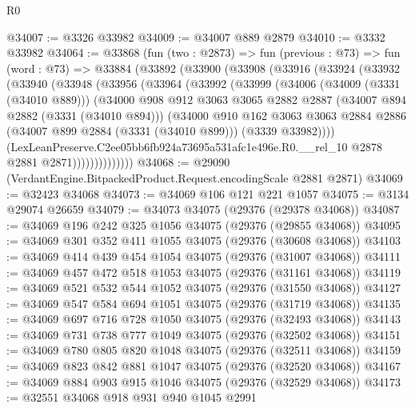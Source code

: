 \begin{lexlean}{R0}
\begin{coremodule}
@34007 := @3326 @33982
@34009 := @34007 @889 @2879
@34010 := @3332 @33982
@34064 := @33868
    (fun (two : @2873) =>
    fun (previous : @73) =>
    fun (word : @73) =>
    @33884
      (@33892
        (@33900
          (@33908
            (@33916
              (@33924
                (@33932
                  (@33940
                    (@33948
                      (@33956
                        (@33964
                          (@33992
                            (@33999
                              (@34006
                                (@34009 (@3331 (@34010 @889)))
                                (@34000
                                  @908
                                  @912
                                  @3063
                                  @3065
                                  @2882
                                  @2887
                                  (@34007 @894 @2882 (@3331 (@34010 @894)))
                                  (@34000
                                    @910
                                    @162
                                    @3063
                                    @3063
                                    @2884
                                    @2886
                                    (@34007 @899 @2884 (@3331 (@34010 @899)))
                                    (@3339 @33982))))
                              (LexLeanPreserve.C2ee05bb6fb924a73695a531afc1e496e.R0.__rel_10
                                @2878
                                @2881
                                @2871))))))))))))))
@34068 := @29090 (VerdantEngine.BitpackedProduct.Request.encodingScale @2881 @2871)
@34069 := @32423 @34068
@34073 := @34069 @106 @121 @221 @1057
@34075 := @3134 @29074 @26659
@34079 := @34073 @34075 (@29376 (@29378 @34068))
@34087 := @34069 @196 @242 @325 @1056 @34075 (@29376 (@29855 @34068))
@34095 := @34069 @301 @352 @411 @1055 @34075 (@29376 (@30608 @34068))
@34103 := @34069 @414 @439 @454 @1054 @34075 (@29376 (@31007 @34068))
@34111 := @34069 @457 @472 @518 @1053 @34075 (@29376 (@31161 @34068))
@34119 := @34069 @521 @532 @544 @1052 @34075 (@29376 (@31550 @34068))
@34127 := @34069 @547 @584 @694 @1051 @34075 (@29376 (@31719 @34068))
@34135 := @34069 @697 @716 @728 @1050 @34075 (@29376 (@32493 @34068))
@34143 := @34069 @731 @738 @777 @1049 @34075 (@29376 (@32502 @34068))
@34151 := @34069 @780 @805 @820 @1048 @34075 (@29376 (@32511 @34068))
@34159 := @34069 @823 @842 @881 @1047 @34075 (@29376 (@32520 @34068))
@34167 := @34069 @884 @903 @915 @1046 @34075 (@29376 (@32529 @34068))
@34173 := @32551 @34068 @918 @931 @940 @1045 @2991

\end{coremodule}
\end{lexlean}
